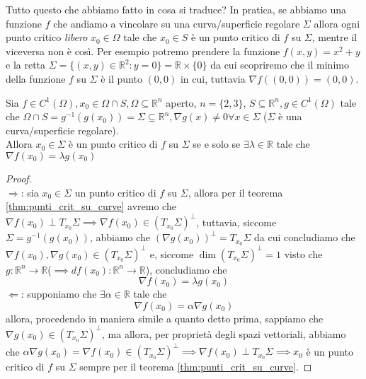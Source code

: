 \begin{remark}
Tutto questo che abbiamo fatto in cosa si traduce? In pratica, se abbiamo una funzione $f$ che andiamo a vincolare su una curva/superficie regolare $\Sigma$ allora ogni punto critico \emph{libero} $x_0 \in \Omega$ tale che $x_0 \in S$ è un punto critico di $f$ su $\Sigma$, mentre il viceversa non è così. Per esempio potremo prendere la funzione $f(x, y) = x^2 + y$ e la retta $\Sigma = \{(x, y) \in \mathbb{R}^2 : y=0 \} = \mathbb{R} \times \{ 0 \}$ da cui scopriremo che il minimo della funzione $f$ su $\Sigma$ è il punto $(0, 0)$ in cui, tuttavia $\nabla f((0, 0)) = (0, 0)$. 
\end{remark}
\begin{theorem}
Sia $f \in C^{1} (\Omega), x_0 \in \Omega \cap S, \Omega \subseteq \mathbb{R}^n$ aperto, $n= \{ 2, 3 \}$, $S \subseteq \mathbb{R}^n, g \in C^1 (\Omega)$ tale che $\Omega \cap S = g^{-1}(g(x_0)) = \Sigma \subseteq \mathbb{R}^n, \nabla g(x) \neq 0 \forall x \in \Sigma$ ($\Sigma$ è una curva/superficie regolare). \\
Allora $x_0 \in \Sigma$ è un punto critico di $f$ su $\Sigma$ se e solo se $\exists \lambda \in \mathbb{R}$ tale che $\nabla f(x_0) = \lambda g(x_0)$
\end{theorem}
\begin{proof} \hspace{1cm} \\
$\boxed{\Rightarrow}$: sia $x_0 \in \Sigma$ un punto critico di $f$ su $\Sigma$, allora per il teorema \ref{thm:punti_crit_su_curve}  avremo che $\nabla f(x_0) \perp T_{x_0} \Sigma \implies \nabla f(x_0) \in (T_{x_0} \Sigma)^{\perp}$, tuttavia, siccome $\Sigma = g^{-1}(g(x_0))$, abbiamo che $(\nabla g(x_0))^{\perp} = T_{x_0} \Sigma$ da cui concludiamo che $\nabla f(x_0), \nabla g(x_0) \in (T_{x_0} \Sigma)^{\perp}$ e, siccome $\dim{(T_{x_0} \Sigma)^{\perp}} = 1$ visto che $g: \mathbb{R}^n \to \mathbb{R}$($\implies df(x_0): \mathbb{R}^n \to \mathbb{R}$), concludiamo che 
$$
\nabla f(x_0) = \lambda g(x_0)
$$
$\boxed{\Leftarrow}$: supponiamo che $\exists \alpha \in \mathbb{R}$ tale che
$$
\nabla f(x_0) = \alpha \nabla g(x_0)
$$
allora, procedendo in maniera simile a quanto detto prima, sappiamo che $\nabla g(x_0) \in (T_{x_0} \Sigma)^{\perp}$, ma allora, per proprietà degli spazi vettoriali, abbiamo che $\alpha \nabla g(x_0) = \nabla f(x_0) \in (T_{x_0} \Sigma)^{\perp} \implies \nabla f(x_0) \perp T_{x_0} \Sigma \implies x_0$ è un punto critico di $f$ su $\Sigma$ sempre per il teorema \ref{thm:punti_crit_su_curve}.
\end{proof}
